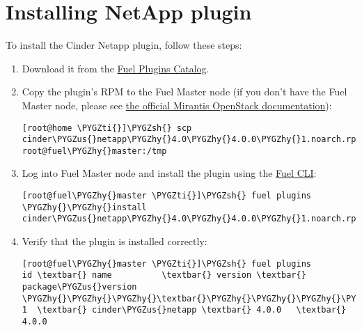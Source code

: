 \documentclass[letterpaper,10pt,english]{sphinxmanual}
\def\PYGZus{\char`\_}
\def\PYGZsh{\char`\#}
\def\PYGZhy{\char`\-}
\def\PYGZti{\char`\~}
\begin{document}
\chapter{Installing NetApp plugin}
\label{installation:installing-netapp-plugin}\label{installation::doc}
To install the Cinder Netapp plugin, follow these steps:
\begin{enumerate}
\item {} 
Download it from the \href{https://www.mirantis.com/products/openstack-drivers-and-plugins/fuel-plugins/}{Fuel Plugins Catalog}.

\item {} 
Copy the plugin's RPM to the Fuel Master node (if you don't
have the Fuel Master node, please see \href{https://docs.mirantis.com/openstack/fuel/fuel-8.0/quickstart-guide.html\#installing-mirantis-openstack-manually}{the official
Mirantis OpenStack documentation}):

\begin{Verbatim}[commandchars=\\\{\}]
[root@home \PYGZti{}]\PYGZsh{} scp cinder\PYGZus{}netapp\PYGZhy{}4.0\PYGZhy{}4.0.0\PYGZhy{}1.noarch.rpm root@fuel\PYGZhy{}master:/tmp
\end{Verbatim}

\item {} 
Log into Fuel Master node and install the plugin using the
\href{https://docs.mirantis.com/openstack/fuel/fuel-8.0/user-guide.html\#using-fuel-cli}{Fuel CLI}:

\begin{Verbatim}[commandchars=\\\{\}]
[root@fuel\PYGZhy{}master \PYGZti{}]\PYGZsh{} fuel plugins \PYGZhy{}\PYGZhy{}install cinder\PYGZus{}netapp\PYGZhy{}4.0\PYGZhy{}4.0.0\PYGZhy{}1.noarch.rpm
\end{Verbatim}

\item {} 
Verify that the plugin is installed correctly:

\begin{Verbatim}[commandchars=\\\{\}]
[root@fuel\PYGZhy{}master \PYGZti{}]\PYGZsh{} fuel plugins
id \textbar{} name          \textbar{} version \textbar{} package\PYGZus{}version
\PYGZhy{}\PYGZhy{}\PYGZhy{}\textbar{}\PYGZhy{}\PYGZhy{}\PYGZhy{}\PYGZhy{}\PYGZhy{}\PYGZhy{}\PYGZhy{}\PYGZhy{}\PYGZhy{}\PYGZhy{}\PYGZhy{}\PYGZhy{}\PYGZhy{}\PYGZhy{}\PYGZhy{}\textbar{}\PYGZhy{}\PYGZhy{}\PYGZhy{}\PYGZhy{}\PYGZhy{}\PYGZhy{}\PYGZhy{}\PYGZhy{}\PYGZhy{}\textbar{}\PYGZhy{}\PYGZhy{}\PYGZhy{}\PYGZhy{}\PYGZhy{}\PYGZhy{}\PYGZhy{}\PYGZhy{}\PYGZhy{}\PYGZhy{}\PYGZhy{}\PYGZhy{}\PYGZhy{}\PYGZhy{}\PYGZhy{}\PYGZhy{}
1  \textbar{} cinder\PYGZus{}netapp \textbar{} 4.0.0   \textbar{} 4.0.0
\end{Verbatim}

\end{enumerate}
\end{document}
